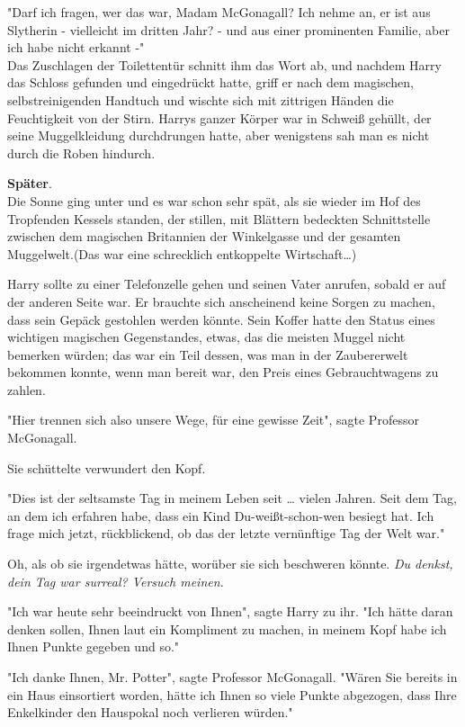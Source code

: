 {"Darf ich fragen, wer das war, Madam McGonagall? Ich nehme an, er ist aus Slytherin - vielleicht im dritten Jahr? - und aus einer prominenten Familie, aber ich habe nicht erkannt -"\\ Das Zuschlagen der Toilettentür schnitt ihm das Wort ab, und nachdem Harry das Schloss gefunden und eingedrückt hatte, griff er nach dem magischen, selbstreinigenden Handtuch und wischte sich mit zittrigen Händen die Feuchtigkeit von der Stirn. Harrys ganzer Körper war in Schweiß gehüllt, der seine Muggelkleidung durchdrungen hatte, aber wenigstens sah man es nicht durch die Roben hindurch.

\textbf{Später}.\\ Die Sonne ging unter und es war schon sehr spät, als sie wieder im Hof des Tropfenden Kessels standen, der stillen, mit Blättern bedeckten Schnittstelle zwischen dem magischen Britannien der Winkelgasse und der gesamten Muggelwelt.(Das war eine schrecklich entkoppelte Wirtschaft…)

Harry sollte zu einer Telefonzelle gehen und seinen Vater anrufen, sobald er auf der anderen Seite war. Er brauchte sich anscheinend keine Sorgen zu machen, dass sein Gepäck gestohlen werden könnte. Sein Koffer hatte den Status eines wichtigen magischen Gegenstandes, etwas, das die meisten Muggel nicht bemerken würden; das war ein Teil dessen, was man in der Zaubererwelt bekommen konnte, wenn man bereit war, den Preis eines Gebrauchtwagens zu zahlen.

"Hier trennen sich also unsere Wege, für eine gewisse Zeit", sagte Professor McGonagall.

Sie schüttelte verwundert den Kopf.

"Dies ist der seltsamste Tag in meinem Leben seit … vielen Jahren. Seit dem Tag, an dem ich erfahren habe, dass ein Kind Du-weißt-schon-wen besiegt hat. Ich frage mich jetzt, rückblickend, ob das der letzte vernünftige Tag der Welt war."

Oh, als ob sie irgendetwas hätte, worüber sie sich beschweren könnte. \emph{Du denkst, dein Tag war surreal? Versuch meinen.}

"Ich war heute sehr beeindruckt von Ihnen", sagte Harry zu ihr. "Ich hätte daran denken sollen, Ihnen laut ein Kompliment zu machen, in meinem Kopf habe ich Ihnen Punkte gegeben und so."

"Ich danke Ihnen, Mr. Potter", sagte Professor McGonagall. "Wären Sie bereits in ein Haus einsortiert worden, hätte ich Ihnen so viele Punkte abgezogen, dass Ihre Enkelkinder den Hauspokal noch verlieren würden."

}
